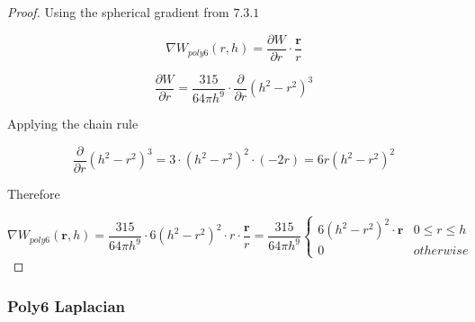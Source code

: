 \documentclass[12pt]{article}
\begin{document}
    \begin{proof}
        Using the spherical gradient from $7.3.1$

        $$\nabla W_{poly6}(r, h) = \frac{\partial{W}}{\partial{r}} \cdot \frac{\textbf{r}}{r}$$

        $$\frac{\partial{W}}{\partial{r}} = \frac{315}{64\pi{h}^9} \cdot \frac{\partial}{\partial{r}} (h^2 - r^2)^3$$

        Applying the chain rule

        $$\frac{\partial}{\partial{r}} (h^2 - r^2)^3 = 3 \cdot (h^2 - r^2)^2 \cdot (-2r) = 6r(h^2 - r^2)^2$$

        Therefore

        $$\nabla W_{poly6}(\textbf{r}, h) = \frac{315}{64\pi{h}^9} \cdot 6(h^2 - r^2)^2 \cdot r \cdot \frac{\textbf{r}}{r} = \frac{315}{64\pi{h}^9}
        \begin{cases}
            6(h^2 - r^2)^2 \cdot \textbf{r} & 0 \leq r \leq h \\
            0 & otherwise
        \end{cases}$$
    \end{proof}

    \subsubsection{Poly6 Laplacian}
\end{document}

